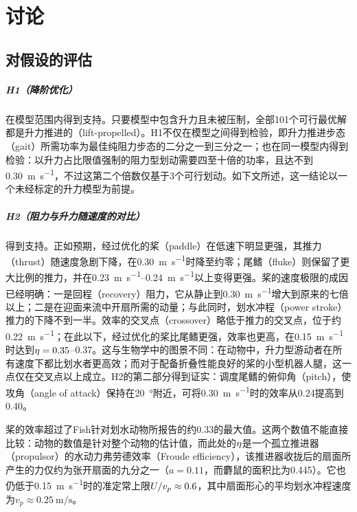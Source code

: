 \chapter{讨论}
\label{ch:discussion}

\section{对假设的评估}
\label{sec:disc-hyp}

\paragraph{H1（降阶优化）}在模型范围内得到支持。只要模型中包含升力且未被压制，全部101个可行最优解都是升力推进的（lift-propelled）。H1不仅在模型之间得到检验，即升力推进步态（gait）所需功率为最佳纯阻力步态的二分之一到三分之一；也在同一模型内得到检验：以升力占比限值强制的阻力型划动需要四至十倍的功率，且达不到\SI{0.30}{\metre\per\second}，不过这第二个倍数仅基于3个可行划动。如下文所述，这一结论以一个未经标定的升力模型为前提。

\paragraph{H2（阻力与升力随速度的对比）}得到支持。正如预期，经过优化的桨（paddle）在低速下明显更强，其推力（thrust）随速度急剧下降，在\SI{0.30}{\metre\per\second}时降至约零；尾鳍（fluke）则保留了更大比例的推力，并在\SIrange{0.23}{0.24}{\metre\per\second}以上变得更强。桨的速度极限的成因已经明确：一是回程（recovery）阻力，它从静止到\SI{0.30}{\metre\per\second}增大到原来的七倍以上；二是在迎面来流中开扇所需的动量；与此同时，划水冲程（power stroke）推力的下降不到一半。效率的交叉点（crossover）略低于推力的交叉点，位于约\SI{0.22}{\metre\per\second}；在此以下，经过优化的桨比尾鳍更强，效率也更高，在\SI{0.15}{\metre\per\second}时达到$\eta=0.35$--0.37。这与生物学中的图景不同：在动物中，升力型游动者在所有速度下都比划水者更高效\cite{Fish1996}；而对于配备折叠性能良好的桨的小型机器人腿，这一点仅在交叉点以上成立。H2的第二部分得到证实：调度尾鳍的俯仰角（pitch），使攻角（angle of attack）保持在\SI{20}{\degree}附近，可将\SI{0.30}{\metre\per\second}时的效率从0.24提高到0.40。

桨的效率超过了Fish针对划水动物所报告的约0.33的最大值\cite{Fish1984,Fish1996}。这两个数值不能直接比较：动物的数值是针对整个动物的估计值，而此处的$\eta$是一个孤立推进器（propulsor）的水动力弗劳德效率（Froude efficiency），该推进器收拢后的扇面所产生的力仅约为张开扇面的九分之一（$a=0.11$，而麝鼠的面积比为0.445）。它也仍低于\SI{0.15}{\metre\per\second}时的准定常上限$U/v_p\approx0.6$，其中扇面形心的平均划水冲程速度为$v_p\approx\SI{0.25}{\metre\per\second}$。

